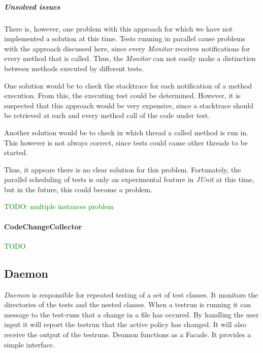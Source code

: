 \documentclass[i2]{oss}
\newcommand{\class}[1]{\emph{#1}}
\newcommand{\junit}{\emph{JUnit }}
\newcommand{\comment}[1]{{\huge \textcolor{green}{#1}}\\}
\begin{document}
\subparagraph{Unsolved issues}

There is, however, one problem with this approach for which we have not implemented a solution at this time.
Tests running in parallel cause problems with the approach discussed here, since every \class{Monitor} receives notifications for every method that is called.
Thus, the \class{Monitor} can not easily make a distinction between methods executed by different tests.

One solution would be to check the stacktrace for each notification of a method execution. 
From this, the executing test could be determined.
However, it is suspected that this approach would be very expensive, since a stacktrace should be retrieved at each and every method call of the code under test.

Another solution would be to check in which thread a called method is run in.
This however is not always correct, since tests could cause other threads to be started.

Thus, it appears there is no clear solution for this problem.
Fortunately, the parallel scheduling of tests is only an experimental feature in \junit at this time, but in the future, this could become a problem.

\comment{TODO: multiple instances problem}

\paragraph{CodeChangeCollector}

\comment{TODO}


\subsection{Daemon}
\label{subssec: deamon}

\class{Daemon} is responsible for repeated testing of a set of test classes. It monitors the directories of the tests and the nested classes. When a testrun is running it can message to the test-runs that a change in a file has occured. By handling the user input it will report the testrun that the active policy has changed. It will also receive the output of the testruns. 
Deamon functions as a Facade. It provides a simple interface. %
 

\end{document}
